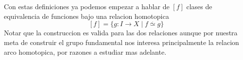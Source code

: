 Con estas definiciones ya podemos empezar a hablar de \([f]\) clases
de equivalencia de funciones bajo una relacion homotopica
\[ [f] = \{ g : I \to X \mid f \stackrel{.}{\simeq} g \} \]
Notar que la construccion es valida para las dos relaciones aunque por
nuestra meta de construir el grupo fundamental nos interesa
principalmente la relacion arco homotopica, por razones a estudiar mas
adelante.
